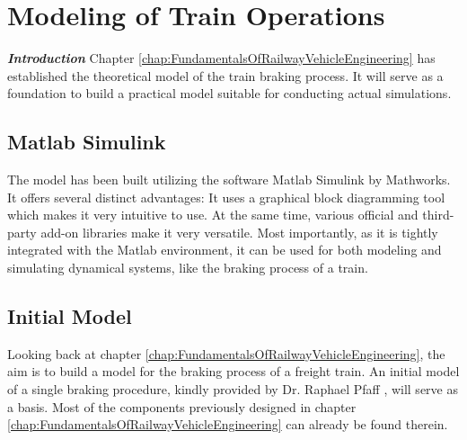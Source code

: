 \chapter{Modeling of Train Operations}
\label{chap:ModelingOfTrainOperations}
\par\noindent
\textit{\textbf{Introduction}} Chapter \ref{chap:FundamentalsOfRailwayVehicleEngineering} has established the theoretical model of the train braking process. It will serve as a foundation to build a practical model suitable for conducting actual simulations. 

\section{Matlab Simulink}
\label{sec:MatlabSimulink}
The model has been built utilizing the software Matlab Simulink by Mathworks. It offers several distinct advantages: It uses a graphical block diagramming tool which makes it very intuitive to use. At the same time, various official and third-party add-on libraries make it very versatile. Most importantly, as it is tightly integrated with the Matlab environment, it can be used for both modeling and simulating dynamical systems, like the braking process of a train.

\section{Initial Model}
\label{sec:InitialModel}
\par\noindent
Looking back at chapter \ref{chap:FundamentalsOfRailwayVehicleEngineering}, the aim is to build a model for the braking process of a freight train. An initial model of a single braking procedure, kindly provided by Dr. Raphael Pfaff \cite{Pfaff2019}, will serve as a basis. Most of the components previously designed in chapter \ref{chap:FundamentalsOfRailwayVehicleEngineering} can already be found therein.  

